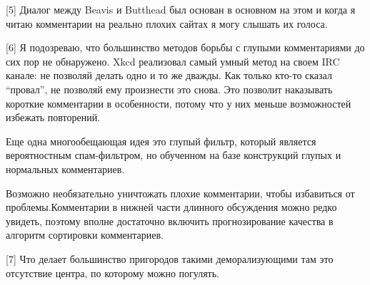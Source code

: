 \documentclass[ebook,12pt,oneside,openany]{memoir}
\begin{document}
[5] Диалог между Beavis и Butthead был основан в основном на этом и
когда я читаю комментарии на реально плохих сайтах я могу слышать их
голоса. \newline

[6] Я подозреваю, что большинство методов борьбы с глупыми
комментариями до сих пор не обнаружено. Xkcd реализовал самый умный
метод на своем IRC канале: не позволяй делать одно и то же дважды. Как
только кто-то сказал “провал”, не позволяй ему произнести это снова.
Это позволит наказывать короткие комментарии в особенности, потому что
у них меньше возможностей избежать повторений. \newline

Еще одна многообещающая идея это глупый фильтр, который является
вероятностным спам-фильтром, но обученном на базе конструкций глупых и
нормальных комментариев. \newline

Возможно необязательно уничтожать плохие комментарии, чтобы избавиться
от проблемы.Комментарии в нижней части длинного обсуждения можно редко
увидеть, поэтому вполне достаточно включить прогнозирование качества в
алгоритм сортировки комментариев. \newline

[7] Что делает большинство пригородов такими деморализующими там это
отсутствие центра, по которому можно погулять. \newline
\end{document}
